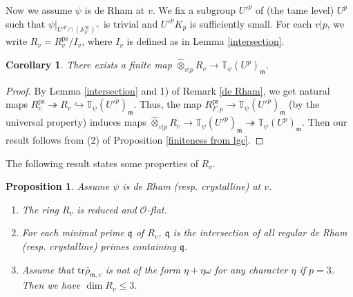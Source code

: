 \documentclass[a4paper, 12pt]{amsart}
\newtheorem{cor}[thm]{Corollary}
\newtheorem{prop}[thm]{Proposition}
\def\ps{\mathrm{ps}}
\newcommand{\T}{\mathbb{T}}
\newcommand{\A}{\mathbb{A}}
\newcommand{\tr}{\mathrm{tr}}
\newcommand{\cO}{\mathcal{O}}
\newcommand{\kq}{\mathfrak{q}}
\newcommand{\km}{\mathfrak{m}}
\begin{document}
    Now we assume $\psi$ is de Rham at $v$. We fix a subgroup $U'^p$ of (the tame level) $U^p$ such that $\psi|_{U'^p\cap(\A_F^\infty)^\times}$ is trivial and $U'^pK_p$ is sufficiently small. For each $v|p$, we write $R_v=R_v^\ps/I_v$, where $I_v$ is defined as in Lemma \ref{intersection}.
    
    \begin{cor}\label{finiteness version 1}
    	There exists a finite map $\widehat{\otimes}_{v|p} R_v \to \T_{\psi}(U^p)_\km$.
    \end{cor}
    
    \begin{proof}
    	By Lemma \ref{intersection} and 1) of Remark \ref{de Rham}, we get natural maps $R_v^\ps \twoheadrightarrow R_v \hookrightarrow \T_{\psi}(U'^p)_\km $. Thus, the map $R_{F,p}^\ps \to \T_{\psi}(U'^p)_\km$ (by the universal property) induces maps $\widehat{\otimes}_{v|p} R_v \to \T_{\psi}(U'^p)_\km \twoheadrightarrow  \T_{\psi}(U^p)_\km$. Then our result follows from (2) of Proposition \ref{finiteness from lgc}.
    \end{proof}
    
    The following result states some properties of $R_v$.
    
    \begin{prop}\label{R_v}  Assume $\psi$ is de Rham (resp. crystalline) at $v$.
    	\begin{enumerate}
    		\item The ring $R_v$ is reduced and $\cO$-flat.
    		\item  For each minimal prime $\kq$ of $R_v$, $\kq$ is the intersection of all regular de Rham (resp. crystalline) primes containing $\kq$.
    		\item  Assume that $\tr \bar{\rho}_{\km, v} $ is not of the form $\eta + \eta\omega$ for any character $\eta$ if $p=3$. Then we have $\dim R_v \le 3$.
    	\end{enumerate}
    \end{prop}
    
\end{document}
